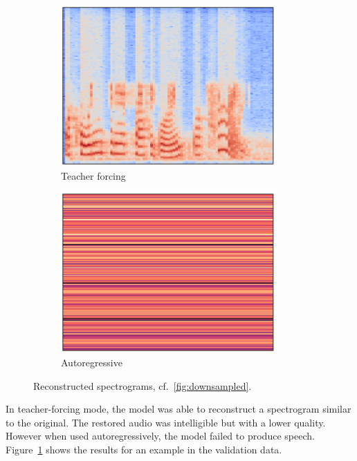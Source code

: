 \documentclass[11pt]{article}
\begin{document}
\begin{figure}
  \begin{subfigure}{0.5\textwidth}
    \centering
    \includegraphics[width=0.9\textwidth]{image/forcing.pdf}
    \caption*{Teacher forcing}
  \end{subfigure}%
  \begin{subfigure}{0.5\textwidth}
    \centering
    \includegraphics[width=0.9\textwidth]{image/autoreg.pdf}
    \caption*{Autoregressive}
  \end{subfigure}
  \caption{\label{fig:recons}Reconstructed spectrograms, cf.~\ref{fig:downsampled}.}
\end{figure}

In teacher-forcing mode, the model was able to reconstruct a spectrogram similar to the original.
The restored audio was intelligible but with a lower quality.
However when used autoregressively, the model failed to produce speech.
Figure~\ref{fig:recons} shows the results for an example in the validation data.
\end{document}
